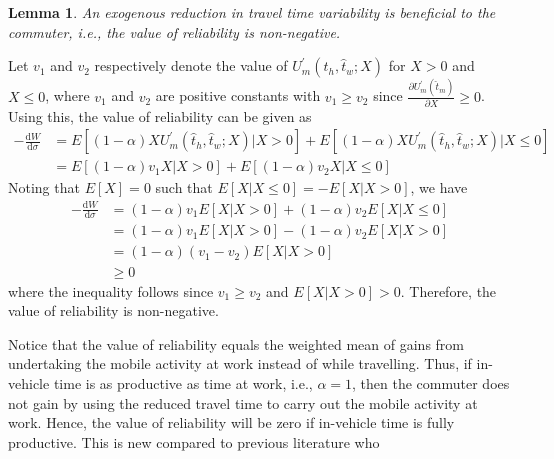 \documentclass[12pt,a4paper,british]{article}
\makeatletter
\newenvironment{proof}[1][\proofname]{\par
    \normalfont\topsep6\p@\@plus6\p@\relax
    \trivlist
    \itemindent\parindent
    \item[\hskip\labelsep
          \scshape
      #1]\ignorespaces
  }{%
    \endtrivlist\@endpefalse
  }
\providecommand{\proofname}{Proof}
\newtheorem{lemma}{Lemma}[section]
\makeatother
\begin{document}
\begin{lemma}
An exogenous reduction in travel time variability is beneficial to the commuter, i.e., the value of reliability is non-negative.
\end{lemma}

\begin{proof}
Let $ v_1 $ and $v_2$ respectively denote the value of $U_{m}^{\prime}\left(\hat{t}_{h}, \hat{t}_{w}; X\right)$ for $ X > 0$ and $X \leq 0$, where $v_{1}$ and $v_{2}$ are positive constants with $v_{1}\geq v_{2}$ since $\frac{\partial U_{m}^{\prime} \left(\hat{t}_{m}\right)}{\partial X} \geq 0$. Using this, the value of reliability can be given as
\begin{align*}
-\frac{\mathrm{d}W}{\mathrm{d}\sigma} & = E\left[\left(1-\alpha\right) X U_{m}^{\prime} \left(\hat{t}_{h}, \hat{t}_{w}; X\right)\vert X>0\right]  + E\left[\left( 1 - \alpha \right) X U_{m}^{\prime}\left( \hat{t}_{h}, \hat{t}_{w}; X\right) \vert X\leq 0 \right] \\
 & = E\left[\left( 1 - \alpha \right) v_{1} X \vert X > 0 \right] + E\left[\left( 1 - \alpha \right) v_{2} X \vert X \leq 0 \right]
 \end{align*}%
Noting that $E\left[X\right]=0$ such that $E\left[X \vert X \leq 0 \right] = -E\left[ X \vert X > 0 \right]$, we have%
\begin{align*}
- \frac{\mathrm{d}W}{\mathrm{d}\sigma} & = \left(1-\alpha\right) v_{1} E\left[X\vert X > 0 \right] + \left(1-\alpha \right) v_{2} E\left[X \vert X\leq0\right]\\
 & =\left(1-\alpha\right)v_{1}E\left[X\vert X>0\right]-\left(1-\alpha\right)v_{2}E\left[X\vert X>0\right]\\
 & =\left(1-\alpha\right)\left(v_{1}-v_{2}\right)E\left[X\vert X>0\right]\\
 & \geq0
\end{align*}
where the inequality follows since $v_{1}\geq v_{2}$ and $E\left[X\vert X>0\right] > 0$. Therefore, the value of reliability is non-negative.
\end{proof}

Notice that the value of reliability equals the weighted mean of gains from undertaking the mobile activity at work instead of while travelling. Thus, if in-vehicle time is as productive as time at work, i.e., $\alpha=1$, then the commuter does not gain by using the reduced travel time to carry out the mobile activity at work. Hence, the value of reliability will be zero if in-vehicle time is fully productive. This is new compared to previous literature \citep{Small1982SchedulingConsumerActivities,FosgerauEngelson2011ValueTravelTime,FosgerauKarlstroem2010ValueReliability} who
\end{document}

